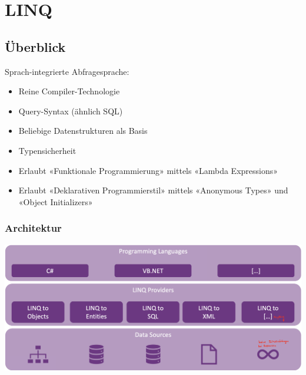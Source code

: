 
\section{LINQ}


\subsection{Überblick}
Sprach-integrierte Abfragesprache:
\begin{itemize}
    \item Reine Compiler-Technologie
    \item Query-Syntax (ähnlich SQL)
    \item Beliebige Datenstrukturen als Basis
    \item Typensicherheit
    \item Erlaubt «Funktionale Programmierung» mittels «Lambda Expressions»
    \item Erlaubt «Deklarativen Programmierstil» mittels «Anonymous Types» und «Object Initializers»
\end{itemize}
\subsubsection{Architektur}
\begin{center}
    \includegraphics[scale=.2]{graphic/linq/Architektur.png}
\end{center}
\vspace{-8pt}

